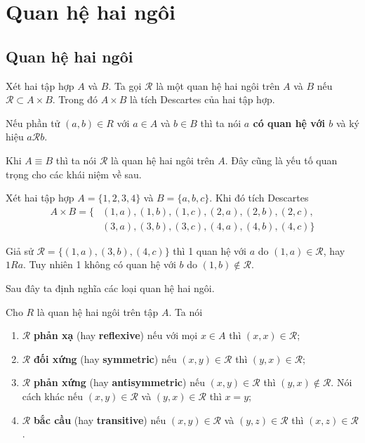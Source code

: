 \chapter{Quan hệ hai ngôi}

\section{Quan hệ hai ngôi}

\begin{definition}
    Xét hai tập hợp $A$ và $B$. Ta gọi $\mathcal{R}$ là một quan hệ hai ngôi trên $A$ và $B$ nếu $\mathcal{R} \subset A \times B$. Trong đó $A \times B$ là tích Descartes của hai tập hợp.
\end{definition}

Nếu phần tử $(a, b) \in R$ với $a \in A$ và $b \in B$ thì ta nói \textbf{$a$ có quan hệ với $b$} và ký hiệu $a \mathcal{R} b$.

Khi $A \equiv B$ thì ta nói $\mathcal{R}$ là quan hệ hai ngôi trên $A$. Đây cũng là yếu tố quan trọng cho các khái niệm về sau.

\begin{example}
    Xét hai tập hợp $A = \{1, 2, 3, 4\}$ và $B = \{a, b, c\}$. Khi đó tích Descartes 
    \begin{align*}
        A \times B = \{
        & (1, a), (1, b), (1, c), (2, a), (2, b), (2, c), \\
        & (3, a), (3, b), (3, c), (4, a), (4, b), (4, c)
    \}
    \end{align*}

    Giả sử $\mathcal{R} = \{(1, a), (3, b), (4, c)\}$ thì 1 quan hệ với $a$ do $(1, a) \in \mathcal{R}$, hay $1 R a$. Tuy nhiên 1 không có quan hệ với $b$ do $(1, b) \not\in \mathcal{R}$.
\end{example}

Sau đây ta định nghĩa các loại quan hệ hai ngôi.

\begin{definition}
    Cho $R$ là quan hệ hai ngôi trên tập $A$. Ta nói
    \begin{enumerate}
        \item $\mathcal{R}$ \textbf{phản xạ} (hay \textbf{reflexive}) nếu với mọi $x \in A$ thì $(x, x) \in \mathcal{R}$;
        \item $\mathcal{R}$ \textbf{đối xứng} (hay \textbf{symmetric}) nếu $(x, y) \in \mathcal{R}$ thì $(y, x) \in \mathcal{R}$;
        \item $\mathcal{R}$ \textbf{phản xứng} (hay \textbf{antisymmetric}) nếu $(x, y) \in \mathcal{R}$ thì $(y, x) \not\in \mathcal{R}$. Nói cách khác nếu $(x, y) \in \mathcal{R}$ và $(y, x) \in \mathcal{R}$ thì $x = y$;
        \item $\mathcal{R}$ \textbf{bắc cầu} (hay \textbf{transitive}) nếu $(x, y) \in \mathcal{R}$ và $(y, z) \in \mathcal{R}$ thì $(x, z) \in \mathcal{R}$.
    \end{enumerate}
\end{definition}

